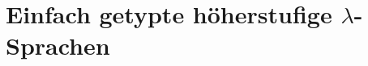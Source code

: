 \documentclass[handout,aspectratio=1610,dvipsnames]{beamer}
\begin{document}
  \section[Einfach getypte höherstufige $\lambda$-Sprachen]{Einfach getypte höherstufige $\lambda$-Sprachen}
  \let\woopsi\section\let\section\subsection\let\subsection\subsubsection
  
  \let\subsection\section\let\section\woopsi
\end{document}
